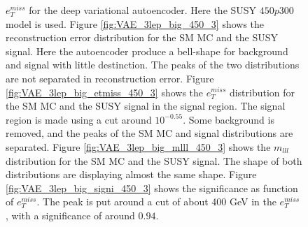 \begin{figure}[H]
{    $e_T^{miss}$ for the deep variational autoencoder. Here the SUSY $450p300$ model is used.
    Figure \ref{fig:VAE_3lep_big_450_3} shows the reconstruction error 
    distribution for the SM MC and the SUSY signal. Here the autoencoder produce a bell-shape for background and 
    signal with little destinction. The peaks of the two distributions are not separated in reconstruction error. Figure \ref{fig:VAE_3lep_big_etmiss_450_3} 
    shows the $e_T^{miss}$ distribution for the SM MC and the SUSY signal in the signal region. 
    The signal region is made using a cut around $10^{-0.55}$. Some background is removed, and the peaks of the SM MC and signal 
    distributions are separated. Figure \ref{fig:VAE_3lep_big_mlll_450_3} shows the $m_{lll}$ distribution for the SM MC and the SUSY signal. 
    The shape of both distributions are displaying almost the same shape. Figure \ref{fig:VAE_3lep_big_signi_450_3} shows the significance as 
    function of $e_T^{miss}$. The peak is put around a cut of about 400 GeV in the $e_T^{miss}$, with a significance of around $0.94$.}
    \label{fig:VAE_3lep_big_rec_sig_signi_450_3}
\end{figure}

